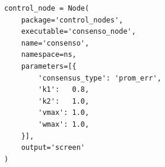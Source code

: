 \begin{figure}[t]
\centering
\begin{lstlisting}[style=python,
    caption={Parámetros del nodo de consenso en el launch file.},
    label={lst:consenso_params}]
control_node = Node(
    package='control_nodes',
    executable='consenso_node',
    name='consenso',
    namespace=ns,
    parameters=[{
        'consensus_type': 'prom_err',
        'k1':   0.8,
        'k2':   1.0,
        'vmax': 1.0,
        'wmax': 1.0,
    }],
    output='screen'
)
\end{lstlisting}
\end{figure}
